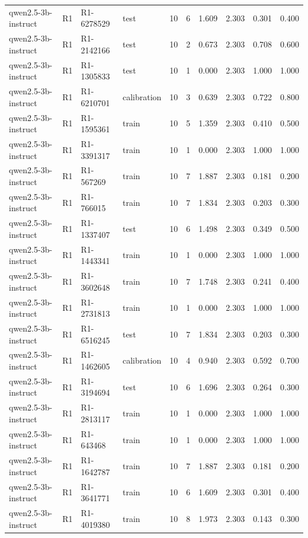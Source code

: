 \begin{table}
\begin{tabular}{llllrrrrrr}
qwen2.5-3b-instruct & R1 & R1-6278529 & test & 10 & 6 & 1.609 & 2.303 & 0.301 & 0.400 \\
qwen2.5-3b-instruct & R1 & R1-2142166 & test & 10 & 2 & 0.673 & 2.303 & 0.708 & 0.600 \\
qwen2.5-3b-instruct & R1 & R1-1305833 & test & 10 & 1 & 0.000 & 2.303 & 1.000 & 1.000 \\
qwen2.5-3b-instruct & R1 & R1-6210701 & calibration & 10 & 3 & 0.639 & 2.303 & 0.722 & 0.800 \\
qwen2.5-3b-instruct & R1 & R1-1595361 & train & 10 & 5 & 1.359 & 2.303 & 0.410 & 0.500 \\
qwen2.5-3b-instruct & R1 & R1-3391317 & train & 10 & 1 & 0.000 & 2.303 & 1.000 & 1.000 \\
qwen2.5-3b-instruct & R1 & R1-567269 & train & 10 & 7 & 1.887 & 2.303 & 0.181 & 0.200 \\
qwen2.5-3b-instruct & R1 & R1-766015 & train & 10 & 7 & 1.834 & 2.303 & 0.203 & 0.300 \\
qwen2.5-3b-instruct & R1 & R1-1337407 & test & 10 & 6 & 1.498 & 2.303 & 0.349 & 0.500 \\
qwen2.5-3b-instruct & R1 & R1-1443341 & train & 10 & 1 & 0.000 & 2.303 & 1.000 & 1.000 \\
qwen2.5-3b-instruct & R1 & R1-3602648 & train & 10 & 7 & 1.748 & 2.303 & 0.241 & 0.400 \\
qwen2.5-3b-instruct & R1 & R1-2731813 & train & 10 & 1 & 0.000 & 2.303 & 1.000 & 1.000 \\
qwen2.5-3b-instruct & R1 & R1-6516245 & test & 10 & 7 & 1.834 & 2.303 & 0.203 & 0.300 \\
qwen2.5-3b-instruct & R1 & R1-1462605 & calibration & 10 & 4 & 0.940 & 2.303 & 0.592 & 0.700 \\
qwen2.5-3b-instruct & R1 & R1-3194694 & test & 10 & 6 & 1.696 & 2.303 & 0.264 & 0.300 \\
qwen2.5-3b-instruct & R1 & R1-2813117 & train & 10 & 1 & 0.000 & 2.303 & 1.000 & 1.000 \\
qwen2.5-3b-instruct & R1 & R1-643468 & train & 10 & 1 & 0.000 & 2.303 & 1.000 & 1.000 \\
qwen2.5-3b-instruct & R1 & R1-1642787 & train & 10 & 7 & 1.887 & 2.303 & 0.181 & 0.200 \\
qwen2.5-3b-instruct & R1 & R1-3641771 & train & 10 & 6 & 1.609 & 2.303 & 0.301 & 0.400 \\
qwen2.5-3b-instruct & R1 & R1-4019380 & train & 10 & 8 & 1.973 & 2.303 & 0.143 & 0.300 \\

\end{tabular}
\end{table}
